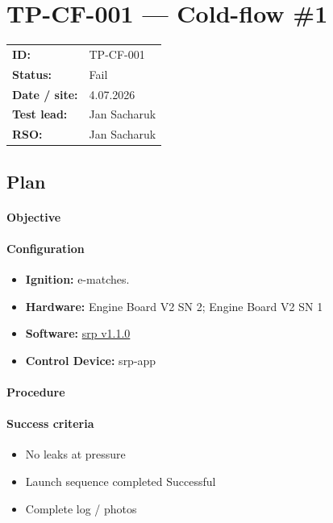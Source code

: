 \section{TP-CF-001 --- Cold-flow \#1}

\begin{tabular}{@{}ll@{}}
\textbf{ID:} & TP-CF-001 \\
\textbf{Status:} & Fail \\
\textbf{Date / site:} & 4.07.2026 \\
\textbf{Test lead:} & Jan Sacharuk \\
\textbf{RSO:} & Jan Sacharuk \\
\end{tabular}

\subsection*{Plan}

\paragraph{Objective}


\paragraph{Configuration}
\begin{itemize}
  \item \textbf{Ignition:} e-matches.
  \item \textbf{Hardware:} Engine Board V2 SN 2; Engine Board V2 SN 1
  \item \textbf{Software:} \href{https://github.com/Simba-Avionic/srp/releases/tag/v1.1.0}{srp v1.1.0}
  \item \textbf{Control Device:} srp-app
\end{itemize}

\paragraph{Procedure}

\paragraph{Success criteria}
\begin{itemize}
  \item No leaks at pressure
  \item Launch sequence completed Successful
  \item Complete log / photos
\end{itemize}

